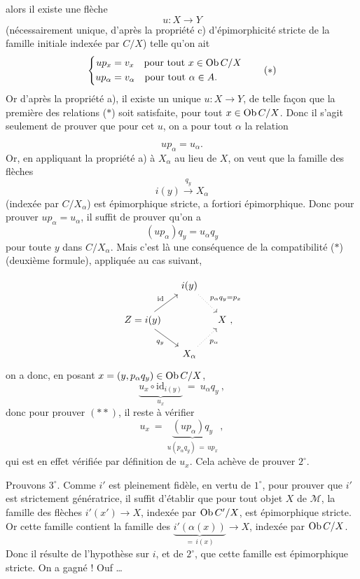 alors il existe une flèche
\[ u : X \longrightarrow Y \]
(nécessairement unique, d'après la propriété c) d'épimorphicité stricte de la famille initiale indexée par $C/X$) telle qu'on ait
\[ \left\{\begin{aligned}
up_x &= v_x \quad \text{pour tout } x \in \Ob C/X\\ %
up_\alpha &= v_\alpha \quad \text{pour tout } \alpha \in A. %
\end{aligned}\right. \tag*{($*$)} \]
Or d'après la propriété a), il existe un unique $u : X \longrightarrow Y$, de telle façon que la première des relations ($*$) soit satisfaite, pour tout $x \in \operatorname{Ob} C/X$. Donc il s'agit seulement de prouver que pour cet $u$, on a pour tout $\alpha$ la relation

\[ up_\alpha = u_\alpha . \]
Or, en appliquant la propriété a) à $X_\alpha$ au lieu de $X$, on veut que la famille des flèches %
\[ i(y) \xrightarrow{q_y} X_\alpha \]
(indexée par $C/X_\alpha$) est épimorphique stricte, a fortiori épimorphique. Donc pour prouver $up_\alpha = u_\alpha$, il suffit de prouver qu'on a
\[ (up_\alpha)q_y = u_\alpha q_y \tag*{($**$)} \]
pour toute $y$ dans $C/X_\alpha$. Mais c'est là une conséquence de la compatibilité ($*$) (deuxième formule), appliquée au cas suivant,


\[
\begin{tikzcd}[column sep=small]
 & i(y) \arrow[dr, dotted, "p_\alpha q_y=p_x"] & \\
Z=i(y) \arrow[ur, "\mathrm{id}"] \arrow[dr, "q_y"'] & & X \ , \\
 & X_\alpha \arrow[ur, dotted, "p_\alpha"'] &
\end{tikzcd}
\]
on a donc, en posant $x=(y,p_\alpha q_y)\in\operatorname{Ob} C/X$,
\[
\underbrace{u_x\circ\mathrm{id}_{i(y)}}_{u_x} \ = \ u_\alpha q_y \ ,
\]
donc pour prouver $(**)$, il reste à vérifier
\[
u_x \ = \ \underbrace{(up_\alpha)q_y}_{u(p_\alpha q_y)\,=\,up_x} \ ,
\]
qui est en effet vérifiée par définition de $u_x$. Cela achève de prouver $2^\circ$.

Prouvons $3^\circ$. Comme $i'$ est pleinement fidèle, en vertu de $1^\circ$, pour prouver que $i'$ est strictement génératrice, il suffit d'établir que pour tout objet $X$ de $\mathcal{M}$, la famille des flèches $i'(x')\longrightarrow X$, indexée par $\operatorname{Ob} C'/X$, est épimorphique stricte. Or cette famille contient la famille des $\underbrace{i'(\alpha(x))}_{=\,i(x)}\longrightarrow X$, indexée par $\operatorname{Ob} C/X$. Donc il résulte de l'hypothèse sur $i$, et de $2^\circ$, que cette famille est épimorphique stricte. On a gagné ! Ouf \dots

